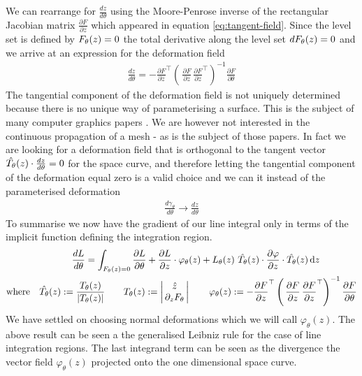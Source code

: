 We can rearrange for $\frac{d z}{d \theta}$ using the Moore-Penrose inverse of the rectangular Jacobian matrix $\frac{\partial F}{\partial z}$ which appeared in equation \eqref{eq:tangent-field}. Since the level set is defined by $F_{\theta}(z)=0$ the total derivative along the level set $dF_{\theta}(z)=0$ and we arrive at an expression for the deformation field \cite{Jos2011OnSurface}
\begin{align}
    \frac{d z}{d \theta} = - \frac{\partial F}{\partial z}^\top
    \left(\,
        \frac{\partial F}{\partial z}\,\frac{\partial F}{\partial z}^\top
    \right)^{-1}
    \frac{\partial F}{\partial\theta}
\end{align}
The tangential component of the deformation field is not uniquely determined because there is no unique way of parameterising a surface. This is the subject of many computer graphics papers \cite{Jos2011OnSurface,Tao2016Near-IsometricTracking,Fujisawa2013CalculationInvariance}. We are however not interested in the continuous propagation of a mesh - as is the subject of those papers. In fact we are looking for a deformation field that is orthogonal to the tangent vector $\hat{T_{\theta}}(z) \cdot\frac{d z}{d\theta} =0$ for the space curve, and therefore letting the tangential component of the deformation equal zero is a valid choice and we can it instead of the parameterised deformation
\begin{align}
    \frac{d \gamma_{\theta}}{d\theta} \rightarrow \frac{d z}{d\theta}
\end{align}
To summarise we now have the gradient of our line integral only in terms of the implicit function defining the integration region.
\begin{align}
    \frac{d L}{d\theta} =\int_{F_{\theta}(z)=0}
        \frac{\partial L}{\partial\theta}+
        \frac{\partial L}{\partial z}\cdot
        \varphi_{\theta}(z)
    +L_{\theta}(z)\,\,
    \hat{T_{\theta}}(z)\cdot\frac{\partial \varphi}{\partial z}\cdot\hat{T_{\theta}}(z)
    \,\mathrm{d}z\qquad\qquad\\
    \mathrm{where}\quad
    \hat{T_{\theta}}(z):= \frac{T_{\theta}(z)}{|T_{\theta}(z)|}
    \qquad
    T_{\theta}(z):=
    \left|\begin{matrix}
        \hat{z} \\
        \,\partial_{z}F_{\theta}\,
    \end{matrix}\right|
    \qquad
    \varphi_{\theta}(z) :=
- \frac{\partial F}{\partial z}^\top
    \left(\,
        \frac{\partial F}{\partial z}\,\frac{\partial F}{\partial z}^\top
    \right)^{-1}
    \frac{\partial F}{\partial\theta}
\end{align}
We have settled on choosing normal deformations which we will call $\varphi_\theta(z)$. The above result can be seen a the generalised Leibniz rule \cite{Flanders1973DifferentiationSign} for the case of line integration regions. The last integrand term can be seen as the divergence the vector field $\varphi_\theta(z)$ projected onto the one dimensional space curve.


